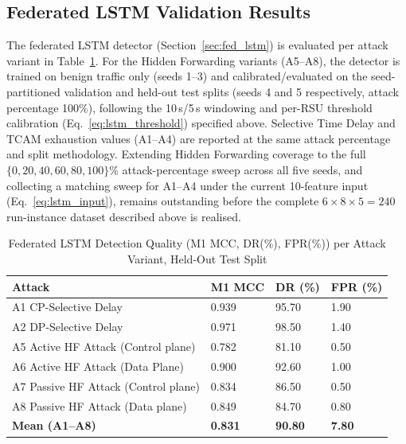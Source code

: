 \documentclass[12pt, a4paper]{report}
\begin{document}
{{%
\subsection{Federated LSTM Validation Results}
\label{sec:lstm_validation}

The federated LSTM detector (Section~\ref{sec:fed_lstm}) is evaluated per
attack variant in Table~\ref{tab:lstm_detection}. For the Hidden Forwarding
variants (A5--A8), the detector is trained on benign traffic only (seeds
1--3) and calibrated/evaluated on the seed-partitioned validation and
held-out test splits (seeds 4 and 5 respectively, attack percentage
100\%), following the 10\,s/5\,s windowing and per-RSU threshold calibration
(Eq.~\ref{eq:lstm_threshold}) specified above. Selective Time Delay and TCAM
exhaustion values (A1--A4) are reported at the same attack percentage and
split methodology. Extending Hidden Forwarding coverage to the full
$\{0,20,40,60,80,100\}\%$ attack-percentage sweep across all five seeds, and
collecting a matching sweep for A1--A4 under the current 10-feature input
(Eq.~\ref{eq:lstm_input}), remains outstanding before the complete
$6\times8\times5=240$ run-instance dataset described above is realised.

\begin{table}[H]
\centering
\caption{Federated LSTM Detection Quality (M1 MCC, DR(\%), FPR(\%)) per Attack Variant, Held-Out Test Split}
\label{tab:lstm_detection}
\renewcommand{\arraystretch}{1.1}
\footnotesize
\begin{tabular}{|p{4.2cm}|p{1.6cm}|p{1.6cm}|p{1.6cm}|}
\hline
\textbf{Attack} & \textbf{M1 MCC} & \textbf{DR (\%)} & \textbf{FPR (\%)} \\
\hline
A1 CP-Selective Delay & 0.939 & 95.70 & 1.90 \\
\hline
A2 DP-Selective Delay & 0.971 & 98.50 & 1.40 \\
\hline
A5 Active HF Attack (Control plane) & 0.782 & 81.10 & 0.50 \\
\hline
A6 Active HF Attack (Data Plane) & 0.900 & 92.60 & 1.00 \\
\hline
A7 Passive HF Attack (Control plane) & 0.834 & 86.50 & 0.50 \\
\hline
A8 Passive HF Attack (Data plane) & 0.849 & 84.70 & 0.80 \\
\hline

\textbf{Mean (A1--A8)} & \textbf{0.831} & \textbf{90.80} & \textbf{7.80} \\
\hline
\end{tabular}
\end{table}

}}
\end{document}
